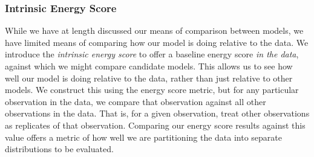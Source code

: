 \subsubsection{Intrinsic Energy Score}
While we have at length discussed our means of comparison between models, we have limited means of
  comparing how our model is doing relative to the data.  We introduce the
  \emph{intrinsic energy score} to offer a baseline energy score \emph{in the data}, against which
  we might compare candidate models.  This allows us to see how well our model is doing relative
  to the data, rather than just relative to other models.  We construct this using the energy score
  metric, but for any particular observation in the data, we compare that observation against all
  other observations in the data.  That is, for a given observation, treat other observations as
  replicates of that observation.  Comparing our energy score results against this value offers a
  metric of how well we are partitioning the data into separate distributions to be evaluated.



